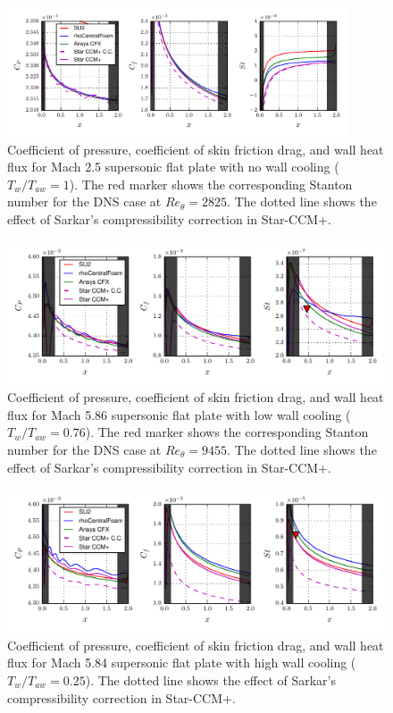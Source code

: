\documentclass[journal ]{new-aiaa}
\begin{document}
\begin{figure}
\centering
  \includegraphics[width=0.9\textwidth]{figs/Plate_RANS2_Cd_new.pdf}
  \caption{Coefficient of pressure, coefficient of skin friction drag, and wall heat flux for Mach 2.5 supersonic flat plate with no wall cooling ($T_w/T_{aw} = 1$). The red marker shows the corresponding Stanton number for the DNS case at $Re_\theta = 2825$. The dotted line shows the effect of Sarkar's compressibility correction in Star-CCM+.}
  \label{fig:Plate_RANS2_Cd}
\end{figure}

\begin{figure}
\centering
  \includegraphics[width=\textwidth]{figs/Plate_RANS6AD_Cd_new.pdf}
  \caption{Coefficient of pressure, coefficient of skin friction drag, and wall heat flux for Mach 5.86 supersonic flat plate with low wall cooling ($T_w/T_{aw} = 0.76$). The red marker shows the corresponding Stanton number for the DNS case at $Re_\theta = 9455$. The dotted line shows the effect of Sarkar's compressibility correction in Star-CCM+.}
  \label{fig:Plate_RANS6AD_Cd}
\end{figure}

\begin{figure}
\centering
  \includegraphics[width=\textwidth]{figs/Plate_RANS6_Cd_new.pdf}
  \caption{Coefficient of pressure, coefficient of skin friction drag, and wall heat flux for Mach 5.84 supersonic flat plate with high wall cooling ($T_w/T_{aw} = 0.25$). The dotted line shows the effect of Sarkar's compressibility correction in Star-CCM+.}
  \label{fig:Plate_RANS6_Cd}
\end{figure}
\end{document}
